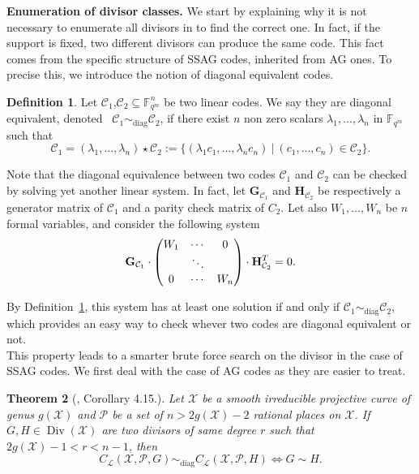 \documentclass[10pt]{article}
\newtheorem{thm}{Theorem}
\theoremstyle{definition}
\theoremstyle{definition}
\theoremstyle{definition}
\newtheorem{def1}[thm]{Definition}
\newcommand{\cd}{\cdot}
\newcommand{\C}{\mathcal{C}}
\newcommand{\fqm}{\mathbb{F}_{q^m}}
\newcommand{\su}{\subseteq}
\newcommand{\X}{\mathcal{X}}
\newcommand{\PR}{\mathcal{P}}
\newcommand{\Div}{\operatorname{Div}}
\newcommand{\calL}{\mathcal{L}}
\begin{document}
\vspace*{0.2cm}

\noindent \textbf{Enumeration of divisor classes.} We start by explaining why it is not necessary to enumerate all divisors in to find the correct one. In fact, if the support is fixed, two different divisors can produce the same code. This fact comes from the specific structure of SSAG codes, inherited from AG ones. To precise this, we introduce the notion of diagonal equivalent codes.

\begin{def1} \label{diag}
Let $\C_1$,$\C_2 \su \fqm^n$ be two linear codes. We say they are diagonal equivalent, denoted \ $\C_1 \sim_{\mathrm{diag}} \C_2$, if there exist $n$ non zero scalars $\lambda_1,...,\lambda_n$ in $\fqm$ such that 
\[\C_1 = (\lambda_1,...,\lambda_n) \star \C_2 := \{(\lambda_1c_1,...,\lambda_nc_n) \ | \ (c_1,...,c_n) \in \C_2\}.\]
\end{def1} 

Note that the diagonal equivalence between two codes $\C_1$ and $\C_2$ can be checked by solving yet another linear system. In fact, let $\mathbf{G}_{\C_1}$ and $\mathbf{H}_{\C_2}$ be respectively a generator matrix of $\C_1$ and a parity check matrix of $C_2$. Let also $W_1,...,W_n$ be $n$ formal variables, and consider the following system
\begin{equation} \label{equiv}
\mathbf{G}_{\C_1} \cd \begin{pmatrix}
W_1 & \cdots & 0 \\
\null & \ddots & \null \\
0 & \cdots & W_n
\end{pmatrix} \cd \mathbf{H}_{\C_2}^T = 0.
\end{equation}

\noindent By Definition~\ref{diag}, this system has at least one solution if and only if $\C_1 \sim_{\mathrm{diag}} \C_2$, which provides an easy way to check whever two codes are diagonal equivalent or not. \\
This property leads to a smarter brute force search on the divisor in the case of SSAG codes. We first deal with the case of AG codes as they are easier to treat. 

\begin{thm} [\cite{CMRP}, Corollary 4.15.]  \label{thmequiv}
Let $\X$ be a smooth irreducible projective curve of genus $g(\X)$ and $\PR$ be a set of $n>2g(\X)-2$ rational places on $\X$. If $G,H \in \Div(\X)$ are two divisors of same degree $r$ such that $2g(\X)-1 < r < n-1$, then  
\[C_{\calL}(\X,\PR,G) \sim_{\mathrm{diag}} C_{\calL}(\X,\PR,H) \iff G \sim H.\]
\end{thm}
\end{document}
